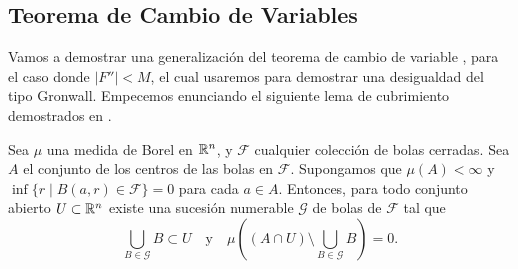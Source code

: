 \subsection{Teorema de Cambio de Variables}
Vamos a demostrar una generalización del teorema de cambio de variable \cite[Teorema 6.1]{P.Mazzone}, para el caso donde $|F''|<M$, el cual usaremos para demostrar una desigualdad del tipo Gronwall.  
Empecemos enunciando el siguiente lema de cubrimiento demostrados en \cite[Corolario I, p 35]{Evanz}.



\begin{lem}
	\label{Lema de  cubrimiento}
	Sea $\mu$ una medida de Borel en $\mathbb{R}^n$, y $\mathcal{F} $ cualquier colección de bolas cerradas. Sea $A$ el conjunto de los centros de las bolas en $\mathcal{F} $. Supongamos que $\mu(A)<\infty$ y $\inf\{r\mid B(a,r)\in \mathcal{F} \}=0$ para cada $a\in A$.  Entonces, para todo conjunto abierto $U\subset\mathbb{R}^n$ existe una sucesión numerable $\mathcal{G} $ de bolas de $\mathcal{F} $ tal que 
	\begin{equation*}
		\bigcup_{B\in \mathcal{G} }B\subset U \quad \text{y}\quad \mu\left( (A\cap U)\setminus\bigcup_{B\in \mathcal{G} }B\right)=0. 
	\end{equation*}
	
	
\end{lem}





